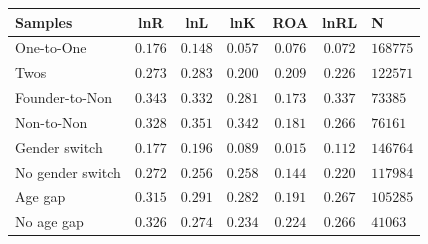\begin{tabular}{l*{5}{c}}
\hline\hline
Samples & lnR & lnL & lnK & ROA & lnRL & N \\
\hline
One-to-One & $0.176$ & $0.148$ & $0.057$ & $0.076$ & $0.072$ & $168775$ \\
Twos & $0.273$ & $0.283$ & $0.200$ & $0.209$ & $0.226$ & $122571$ \\
Founder-to-Non & $0.343$ & $0.332$ & $0.281$ & $0.173$ & $0.337$ & $73385$ \\
Non-to-Non & $0.328$ & $0.351$ & $0.342$ & $0.181$ & $0.266$ & $76161$ \\
Gender switch & $0.177$ & $0.196$ & $0.089$ & $0.015$ & $0.112$ & $146764$ \\
No gender switch & $0.272$ & $0.256$ & $0.258$ & $0.144$ & $0.220$ & $117984$ \\
Age gap & $0.315$ & $0.291$ & $0.282$ & $0.191$ & $0.267$ & $105285$ \\
No age gap & $0.326$ & $0.274$ & $0.234$ & $0.224$ & $0.266$ & $41063$ \\
\hline\hline
\end{tabular}
